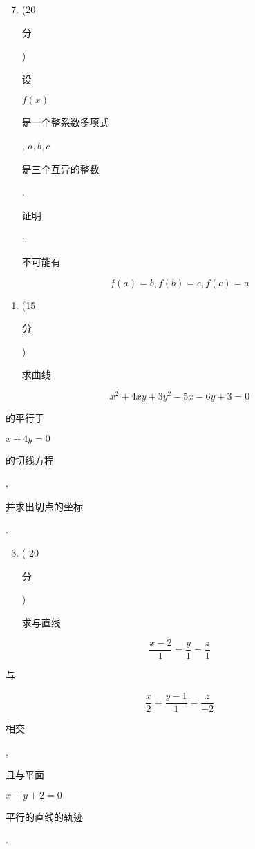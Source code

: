 \documentclass[10pt]{article}
\begin{document}
\begin{enumerate}
  \setcounter{enumi}{6}
  \item (20 \begin{CJK}{UTF8}{mj}分\end{CJK}) \begin{CJK}{UTF8}{mj}设\end{CJK} $f(x)$ \begin{CJK}{UTF8}{mj}是一个整系数多项式\end{CJK}, $a, b, c$ \begin{CJK}{UTF8}{mj}是三个互异的整数\end{CJK}. \begin{CJK}{UTF8}{mj}证明\end{CJK}: \begin{CJK}{UTF8}{mj}不可能有\end{CJK}
\end{enumerate}
$$
f(a)=b, f(b)=c, f(c)=a
$$

\begin{enumerate}
  \item (15 \begin{CJK}{UTF8}{mj}分\end{CJK}) \begin{CJK}{UTF8}{mj}求曲线\end{CJK}
\end{enumerate}
$$
x^{2}+4 x y+3 y^{2}-5 x-6 y+3=0
$$
\begin{CJK}{UTF8}{mj}的平行于\end{CJK} $x+4 y=0$ \begin{CJK}{UTF8}{mj}的切线方程\end{CJK}, \begin{CJK}{UTF8}{mj}并求出切点的坐标\end{CJK}.

\begin{enumerate}
  \setcounter{enumi}{2}
  \item ( 20 \begin{CJK}{UTF8}{mj}分\end{CJK}) \begin{CJK}{UTF8}{mj}求与直线\end{CJK}
\end{enumerate}
$$
\frac{x-2}{1}=\frac{y}{1}=\frac{z}{1}
$$
\begin{CJK}{UTF8}{mj}与\end{CJK}
$$
\frac{x}{2}=\frac{y-1}{1}=\frac{z}{-2}
$$
\begin{CJK}{UTF8}{mj}相交\end{CJK}, \begin{CJK}{UTF8}{mj}且与平面\end{CJK} $x+y+2=0$ \begin{CJK}{UTF8}{mj}平行的直线的轨迹\end{CJK}.
\end{document}
